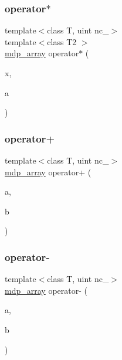 \mbox{\label{classmdp__array_a534b82292f55812fcd8b9c7c11fb2837}} 
\subsubsection{\texorpdfstring{operator$\ast$}{operator*}}
{\footnotesize\ttfamily template$<$class T, uint nc\+\_\+$>$ \\
template$<$class T2 $>$ \\
\hyperlink{classmdp__array}{mdp\+\_\+array} operator$\ast$ (\begin{DoxyParamCaption}\item[{T2}]{x,  }\item[{const \hyperlink{classmdp__array}{mdp\+\_\+array}$<$ T, nc\+\_\+ $>$ \&}]{a }\end{DoxyParamCaption})\hspace{0.3cm}{\ttfamily [friend]}}

\mbox{\label{classmdp__array_a0456c0c6d5e305cc0799ceb7b8639539}} 
\subsubsection{\texorpdfstring{operator+}{operator+}}
{\footnotesize\ttfamily template$<$class T, uint nc\+\_\+$>$ \\
\hyperlink{classmdp__array}{mdp\+\_\+array} operator+ (\begin{DoxyParamCaption}\item[{const \hyperlink{classmdp__array}{mdp\+\_\+array}$<$ T, nc\+\_\+ $>$ \&}]{a,  }\item[{const \hyperlink{classmdp__array}{mdp\+\_\+array}$<$ T, nc\+\_\+ $>$ \&}]{b }\end{DoxyParamCaption})\hspace{0.3cm}{\ttfamily [friend]}}

\mbox{\label{classmdp__array_a97528690c485585f95cfad74e934e621}} 
\subsubsection{\texorpdfstring{operator-\/}{operator-}}
{\footnotesize\ttfamily template$<$class T, uint nc\+\_\+$>$ \\
\hyperlink{classmdp__array}{mdp\+\_\+array} operator-\/ (\begin{DoxyParamCaption}\item[{const \hyperlink{classmdp__array}{mdp\+\_\+array}$<$ T, nc\+\_\+ $>$ \&}]{a,  }\item[{const \hyperlink{classmdp__array}{mdp\+\_\+array}$<$ T, nc\+\_\+ $>$ \&}]{b }\end{DoxyParamCaption})\hspace{0.3cm}{\ttfamily [friend]}}

